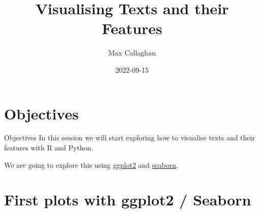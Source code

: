 \documentclass[
  10pt,
  ignorenonframetext,
  aspectratio=169]{beamer}
\title{Visualising Texts and their Features}
\author{Max Callaghan}
\date{2022-09-15}
\begin{document}
\frame{\titlepage}

\hypertarget{objectives}{%
\section{Objectives}\label{objectives}}

\begin{frame}{Objectives}
\protect\hypertarget{objectives-1}{}
In this session we will start exploring how to visualise texts and their
features with R and Python.

We are going to explore this using
\href{https://ggplot2.tidyverse.org/}{ggplot2} and
\href{https://seaborn.pydata.org/}{seaborn}.
\end{frame}

\hypertarget{first-plots-with-ggplot2-seaborn}{%
\section{First plots with ggplot2 /
Seaborn}\label{first-plots-with-ggplot2-seaborn}}
\end{document}
